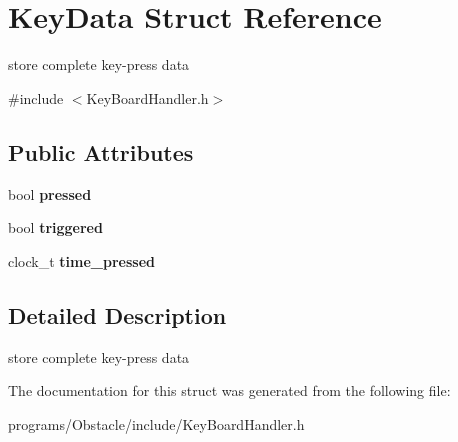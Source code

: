 \hypertarget{struct_key_data}{}\section{Key\+Data Struct Reference}
\label{struct_key_data}


store complete key-\/press data  




{\ttfamily \#include $<$Key\+Board\+Handler.\+h$>$}

\subsection*{Public Attributes}
\begin{DoxyCompactItemize}
\item 
bool {\bfseries pressed}\hypertarget{struct_key_data_a4aecf622900f04cd269e6d6fe3645aed}{}\label{struct_key_data_a4aecf622900f04cd269e6d6fe3645aed}

\item 
bool {\bfseries triggered}\hypertarget{struct_key_data_a86b12ff38e7543ffd14845ee1520934f}{}\label{struct_key_data_a86b12ff38e7543ffd14845ee1520934f}

\item 
clock\+\_\+t {\bfseries time\+\_\+pressed}\hypertarget{struct_key_data_aaa3410689d0fa200a30467555eb0ed75}{}\label{struct_key_data_aaa3410689d0fa200a30467555eb0ed75}

\end{DoxyCompactItemize}


\subsection{Detailed Description}
store complete key-\/press data 

The documentation for this struct was generated from the following file\+:\begin{DoxyCompactItemize}
\item 
programs/\+Obstacle/include/Key\+Board\+Handler.\+h\end{DoxyCompactItemize}
